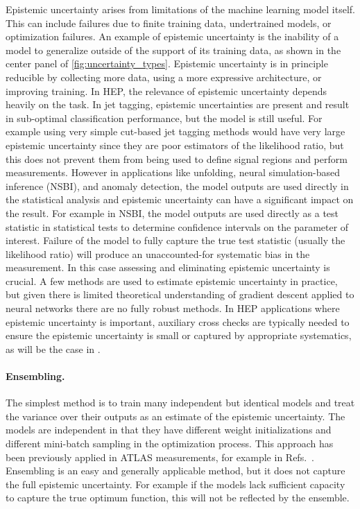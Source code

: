 Epistemic uncertainty arises from limitations of the machine learning model itself.
This can include failures due to finite training data, undertrained models, or optimization failures.
An example of epistemic uncertainty is the inability of a model to generalize outside of the support of its training data, as shown in the center panel of \cref{fig:uncertainty_types}.
Epistemic uncertainty is in principle reducible by collecting more data, using a more expressive architecture, or improving training.
In HEP, the relevance of epistemic uncertainty depends heavily on the task.
In jet tagging, epistemic uncertainties are present and result in sub-optimal classification performance, but the model is still useful.
For example using very simple cut-based jet tagging methods would have very large epistemic uncertainty since they are poor estimators of the likelihood ratio, but this does not prevent them from being used to define signal regions and perform measurements.
However in applications like unfolding, neural simulation-based inference (NSBI), and anomaly detection, the model outputs are used directly in the statistical analysis and epistemic uncertainty can have a significant impact on the result.
For example in NSBI, the model outputs are used directly as a test statistic in statistical tests to determine confidence intervals on the parameter of interest.
Failure of the model to fully capture the true test statistic (usually the likelihood ratio) will produce an unaccounted-for systematic bias in the measurement.
In this case assessing and eliminating epistemic uncertainty is crucial.
A few methods are used to estimate epistemic uncertainty in practice, but given there is limited theoretical understanding of gradient descent applied to neural networks there are no fully robust methods.
In HEP applications where epistemic uncertainty is important, auxiliary cross checks are typically needed to ensure the epistemic uncertainty is small or captured by appropriate systematics, as will be the case in .

\paragraph{Ensembling.}
The simplest method is to train many independent but identical models and treat the variance over their outputs as an estimate of the epistemic uncertainty.
The models are independent in that they have different weight initializations and different mini-batch sampling in the optimization process.
This approach has been previously applied in ATLAS measurements, for example in Refs.~\cite{ATLAS:2024xxl, ATLAS:2025clx}.
Ensembling is an easy and generally applicable method, but it does not capture the full epistemic uncertainty.
For example if the models lack sufficient capacity to capture the true optimum function, this will not be reflected by the ensemble.

